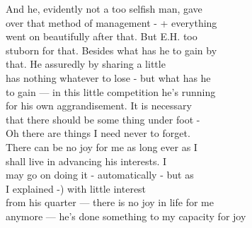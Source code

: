 \documentclass[11pt,a4paper]{article}
\begin{document}
{And he, evidently not a too selfish man, gave \\
over that method of management - + everything \\
went on beautifully after that. But E.H. too \\
stuborn for that. Besides what has he to gain by \\
that. He assuredly  by sharing a little \\
has nothing whatever to lose - but what has he \\
to gain --- in this little competition he's running \\
for his own aggrandisement. It is necessary \\
that there should be some thing under foot - \\
\quad Oh there are things I need never to forget. \\
There can be no joy for me as long ever as I \\
shall live in advancing his interests. I \\
may go on doing it - automatically - but as \\
I explained -) with little interest  \\
from his quarter --- there is no joy in life for me \\
anymore --- he's done something to my capacity for joy}

\end{document}
